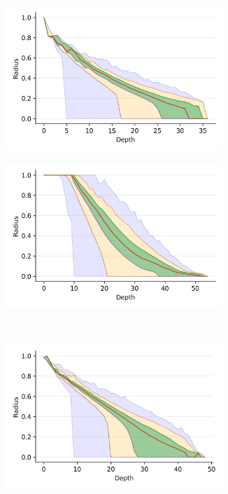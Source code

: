 \documentclass[review,supplement,onefignum,onetabnum]{siamonline220329}
\begin{document}
\begin{figure}
    \captionsetup[subfigure]{aboveskip=-15pt,belowskip=-3pt}
    \begin{subfigure}[b]{0.47\textwidth}
        \includegraphics[width=0.9\textwidth]{images/radius/fashion-mnist.png}\\
        \label{fig:supplement:fashion-mnist-radius}
    \end{subfigure}%
    \begin{subfigure}[b]{0.47\textwidth}
        \includegraphics[width=0.9\textwidth]{images/radius/glove-25.png}\\
        \label{fig:supplement:glove-25-radius}
    \end{subfigure}
    \\
    \begin{subfigure}[b]{0.47\textwidth}
        \includegraphics[width=0.9\textwidth]{images/radius/sift.png}\\

\end{subfigure}
\end{figure}
\end{document}
